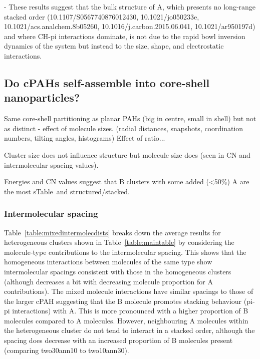 - These results suggest that the bulk structure of A, which presents no long-range stacked order (10.1107/S0567740876012430, 10.1021/jo050233e, 10.1021/acs.analchem.8b05260, 10.1016/j.carbon.2015.06.041, 10.1021/ar950197d) and where CH-pi interactions dominate, is not due to the rapid bowl inversion dynamics of the system but instead to the size, shape, and electrostatic interactions.




\subsection{Do cPAHs self-assemble into core-shell nanoparticles?} 

Same core-shell partitioning as planar PAHs (big in centre, small in shell) but not as distinct - effect of molecule sizes. (radial distances, snapshots, coordination numbers, tilting angles, histograms)
Effect of ratio...

Cluster size does not influence structure but molecule size does (seen in CN and intermolecular spacing values).

Energies and CN values suggest that B clusters with some added (<50\%) A are the most sTable~and structured/stacked.


\subsubsection{Intermolecular spacing}
Table~\ref{table:mixedintermolecdists} breaks down the average results for heterogeneous clusters shown in Table~\ref{table:maintable} by considering the molecule-type contributions to the intermolecular spacing. %
This shows that the homogeneous interactions between molecules of the same type show intermolecular spacings consistent with those in the homogeneous clusters (although decreases a bit with decreasing molecule proportion for A contributions). The mixed molecule interactions have similar spacings to those of the larger cPAH suggesting that the B molecule promotes stacking behaviour (pi-pi interactions) with A.  This is more pronounced with a higher proportion of B molecules compared to A molecules. 
However, neighbouring A molecules within the heterogeneous cluster do not tend to interact in a stacked order, although the spacing does decrease with an increased proportion of B molecules present (comparing two30ann10 to two10ann30). 

